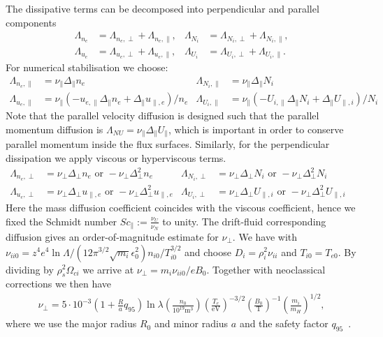 The dissipative terms can be decomposed into perpendicular and parallel components
\begin{align}
 \Lambda_{n_e} &= \Lambda_{n_e,\perp}+\Lambda_{n_e,\parallel}, &
 \Lambda_{N_i} &= \Lambda_{N_i,\perp}+\Lambda_{N_i,\parallel},\\
 \Lambda_{u_e} &= \Lambda_{u_e,\perp}+\Lambda_{u_e,\parallel},&
 \Lambda_{U_i} &= \Lambda_{U_i,\perp}+\Lambda_{U_i,\parallel}.
\end{align}
For numerical stabilisation we choose:
\begin{align}
\Lambda_{n_e,\parallel} &= \nu_\parallel \Delta_\parallel n_e &
\Lambda_{N_i,\parallel} &= \nu_\parallel \Delta_\parallel N_i \\
\Lambda_{u_e,\parallel} &= \nu_\parallel \left( -u_{e,\parallel} \Delta_\parallel n_e + \Delta_\parallel u_{\parallel,e}\right)/n_e &
\Lambda_{U_i,\parallel} &= \nu_\parallel \left( -U_{i,\parallel} \Delta_\parallel N_i + \Delta_\parallel U_{\parallel,i}\right)/N_i &
\end{align}
Note that the parallel velocity diffusion is designed such that the parallel momentum
diffusion is $\Lambda_{NU} = \nu_\parallel \Delta_\parallel U_\parallel$, which
is important in order to conserve parallel momentum inside the flux surfaces.
Similarly, for the perpendicular dissipation we apply viscous or hyperviscous terms.
\begin{align}\label{eq:perpdiffNT}
 \Lambda_{n_e,\perp} &=  \nu_\perp \Delta_\perp n_e \text{ or } -\nu_\perp \Delta_\perp^2 n_e&
 \Lambda_{N_i,\perp} &=  \nu_\perp \Delta_\perp N_i \text{ or } -\nu_\perp \Delta_\perp^2 N_i & \\
 \Lambda_{u_e,\perp} &=  \nu_\perp \Delta_\perp u_{\parallel,e} \text{ or } -\nu_\perp \Delta_\perp^2 u_{\parallel,e} &
 \Lambda_{U_i,\perp} &=  \nu_\perp \Delta_\perp U_{\parallel,i} \text{ or } -\nu_\perp \Delta_\perp^2 U_{\parallel,i}
\end{align}
Here the mass diffusion coefficient coincides with the viscous coefficient, hence we fixed the Schmidt number \(\mathit{Sc}_\parallel:= \frac{\nu_U}{\nu_N}\) to unity.
The drift-fluid corresponding diffusion gives an order-of-magnitude estimate for $\nu_\perp$.
We have with $\nu_{ii0} = z^4e^4\ln \Lambda/ (12\pi^{3/2} \sqrt{m_i} \epsilon_0^2) n_{i0} /T_{i0}^{3/2}$ and choose $D_i = \rho_i^2 \nu_{ii}$ and $T_{i0} = T_{e0}$.
By dividing by $\rho_s^2 \Omega_{ci}$ we arrive at $\nu_\perp = m_i \nu_{ii0}/eB_0$.
Together with neoclassical corrections we then have
\begin{align}
\nu_\perp =
5\cdot 10^{-3} \left(1+\frac{R}{a}q_{95}\right) \ln \lambda
\left(\frac{n_0}{10^{19}\text{m}^3}\right)
\left(\frac{T_e}{\text{eV}}\right)^{-3/2}
\left(\frac{B_0}{\text{T}}\right)^{-1}
\left(\frac{m_i}{m_H}\right)^{1/2},
\end{align}
where we use the major radius $R_0$ and minor radius $a$ and the safety factor $q_{95}$~\cite{Madsen2016}.


